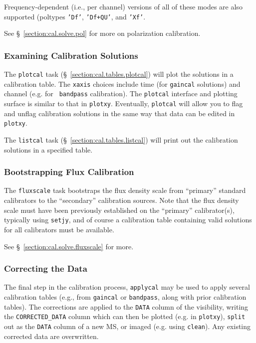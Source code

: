Frequency-dependent (i.e., per channel) versions of all of these modes
are also supported (poltypes {\tt 'Df'}, {\tt 'Df+QU'}, and {\tt 'Xf'}.

See \S~\ref{section:cal.solve.pol} for more on polarization calibration.

\subsubsection{Examining Calibration Solutions}
\label{section:intro.walkthru.calib.plotcal}

The {\tt plotcal} task (\S~\ref{section:cal.tables.plotcal}) will plot the
solutions in a calibration table.  The {\tt xaxis} choices include
time (for {\tt gaincal} solutions) and channel (e.g. for {\tt
bandpass} calibration).  
The {\tt plotcal} interface and plotting surface is similar to that in
{\tt plotxy}.  Eventually, {\tt plotcal} will allow you to flag and
unflag calibration solutions in the same way that data can be edited
in {\tt plotxy}.

The {\tt listcal} task (\S~\ref{section:cal.tables.listcal}) will print out
the calibration solutions in a specified table.

\subsubsection{Bootstrapping Flux Calibration}
\label{section:intro.walkthru.calib.fluxscale}

The {\tt fluxscale} task bootstraps the flux density scale from
``primary'' standard calibrators to the ``secondary'' calibration
sources.  Note that the flux density scale must have been previously
established on the ``primary'' calibrator(s), typically using 
{\tt setjy}, and of course a calibration table containing
valid solutions for all calibrators must be available.

See \S~\ref{section:cal.solve.fluxscale} for more.

\subsubsection{Correcting the Data}
\label{section:intro.walkthru.calib.applycal}

The final step in the calibration process, {\tt applycal} may be used
to apply several calibration tables (e.g., from {\tt gaincal} or
{\tt bandpass}, along with prior calibration tables). 
The corrections are applied to the {\tt DATA} column of the
visibility, writing the {\tt CORRECTED\_DATA} column which can then be
plotted (e.g. in {\tt plotxy}), {\tt split} out as the {\tt DATA}
column of a new MS, or imaged (e.g. using {\tt clean}).  Any existing
corrected data are overwritten.

